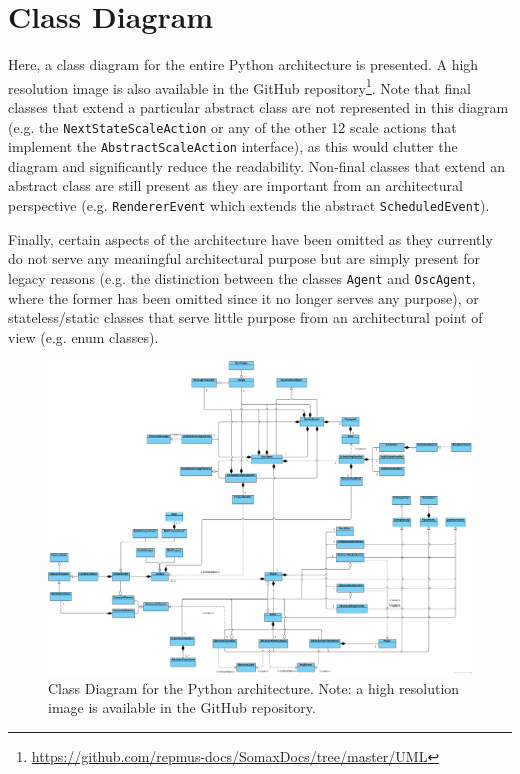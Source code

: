 \chapter{Class Diagram}\label{sec:a-class-diagram}

Here, a class diagram for the entire Python architecture is presented. A high resolution image is also available in the GitHub repository\footnote{\url{https://github.com/repmus-docs/SomaxDocs/tree/master/UML}}. Note that final classes that extend a particular abstract class are not represented in this diagram (e.g. the \texttt{NextStateScaleAction} or any of the other 12 scale actions that implement the \texttt{AbstractScaleAction} interface), as this would clutter the diagram and significantly reduce the readability. Non-final classes that extend an abstract class are still present as they are important from an architectural perspective (e.g. \texttt{RendererEvent} which extends the abstract \texttt{ScheduledEvent}). 

Finally, certain aspects of the architecture have been omitted as they currently do not serve any meaningful architectural purpose but are simply present for legacy reasons (e.g. the distinction between the classes \texttt{Agent} and \texttt{OscAgent}, where the former has been omitted since it no longer serves any purpose), or stateless/static classes that serve little purpose from an architectural point of view (e.g. enum classes). 

 \begin{figure}[h!]
    \centering        
 	\includegraphics[width=1.4\textwidth, keepaspectratio, angle=90]{figures/class-diagram.png}
    \caption{Class Diagram for the Python architecture. Note: a high resolution image is available in the GitHub repository.}
    \label{fig:a-class-diagram}
\end{figure}